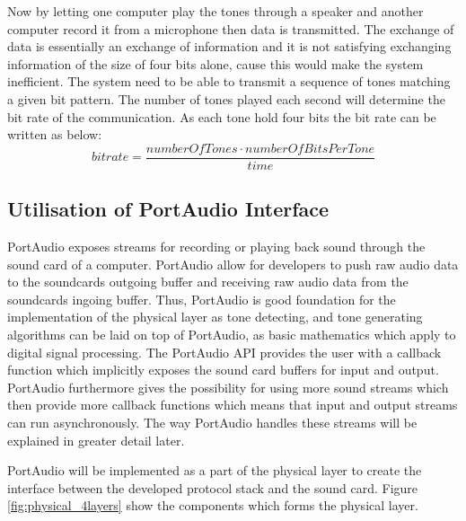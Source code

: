 	Now by letting one computer play the tones through a speaker and another computer record it from
	a microphone then data is transmitted. The exchange of data is essentially an exchange
	of information and it is not satisfying exchanging information of the size of four bits alone,
	cause this would make the system inefficient. The system need to be able to transmit a sequence
	of tones matching a given bit pattern. The number of tones played each second will determine the
	bit rate of the communication. As each tone hold four bits the bit rate can be written as below:
	\begin{equation}bitrate = \frac{numberOfTones \cdot numberOfBitsPerTone}{time}\end{equation}
	
	\subsection{Utilisation of PortAudio Interface}
	PortAudio exposes streams for recording or playing back sound through the sound card of a
	computer. PortAudio allow for developers to push raw audio data to the soundcards outgoing buffer and
	receiving raw audio data from the soundcards ingoing buffer. Thus, PortAudio is good foundation for the
	implementation of the physical layer as tone detecting, and tone generating algorithms can be laid on top
	of PortAudio, as basic mathematics which apply to digital signal processing. The PortAudio API provides the
	user with a callback function which implicitly exposes the sound card buffers for input and output. PortAudio
	furthermore gives the possibility for using more sound streams which then provide more callback functions
	which means that input and output streams can run asynchronously. The way PortAudio handles these streams
	will be explained in greater detail later.
	
	PortAudio will be implemented as a part of the physical layer to create the interface between the developed
	protocol stack and the sound card. Figure \ref{fig:physical_4layers} show the components which forms the physical layer. 
	
